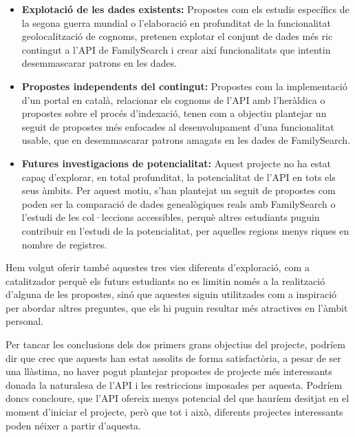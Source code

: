     \begin{itemize}
        \item \textbf{Explotació de les dades existents:} Propostes com els estudis específics de la segona guerra mundial o l’elaboració en profunditat de la funcionalitat geolocalització de cognoms, pretenen explotar el conjunt de dades més ric contingut a l’API de FamilySearch i crear així funcionalitats que intentin desemmascarar patrons en les dades.
        \item \textbf{Propostes independents del contingut:} Propostes com la implementació d’un portal en català, relacionar els cognoms de l’API amb l’heràldica o propostes sobre el procés d’indexació, tenen com a objectiu plantejar un seguit de propostes més enfocades al desenvolupament d’una funcionalitat usable, que en desemmascarar patrons amagats en les dades de FamilySearch.
        \item \textbf{Futures investigacions de potencialitat:} Aquest projecte no ha estat capaç d’explorar, en total profunditat, la potencialitat de l’API en tots els seus àmbits. Per aquest motiu, s’han plantejat un seguit de propostes com poden ser la comparació de dades genealògiques reals amb FamilySearch o l’estudi de les col·leccions accessibles, perquè altres estudiants puguin contribuir en l’estudi de la potencialitat, per aquelles regions menys riques en nombre de registres.
    \end{itemize}

    Hem volgut oferir també aquestes tres vies diferents d’exploració, com a cata\-lit\-zador perquè els futurs estudiants no es limitin només a la realització d’alguna de les propostes, sinó que aquestes siguin utilitzades com a inspiració per abordar altres preguntes, que els hi puguin resultar més atractives en l’àmbit personal.

    Per tancar les conclusions dels dos primers grans objectius del projecte, podríem dir que crec que aquests han estat assolits de forma satisfactòria, a pesar de ser una llàstima, no haver pogut plantejar propostes de projecte més interessants donada la naturalesa de l’API i les restriccions imposades per aquesta. Podríem doncs concloure, que l’API ofereix menys potencial del que hauríem desitjat en el moment d’iniciar el projecte, però que tot i això, diferents projectes interessants poden néixer a partir d’aquesta.
